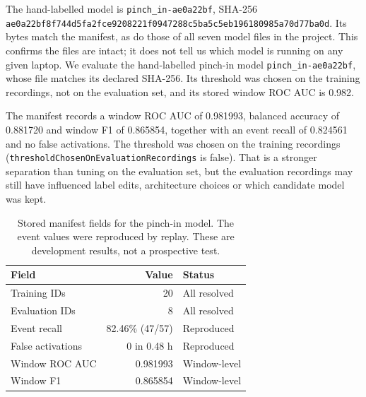 
\label{results}

\iffull
{}\label{later-hand-labelled-development-artifact}
\fi

\iffull
The hand-labelled model is \nolinkurl{pinch_in-ae0a22bf}, SHA-256 \nolinkurl{ae0a22bf8f744d5fa2fce9208221f0947288c5ba5c5eb196180985a70d77ba0d}. Its bytes match the manifest, as do those of all seven model files in the project. This confirms the files are intact; it does not tell us which model is running on any given laptop.
\else
We evaluate the hand-labelled pinch-in model \nolinkurl{pinch_in-ae0a22bf}, whose file matches its declared SHA-256. Its threshold was chosen on the training recordings, not on the evaluation set, and its stored window ROC AUC is 0.982.
\fi

\iffull
The manifest records a window ROC AUC of 0.981993, balanced accuracy of 0.881720 and window F1 of 0.865854, together with an event recall of 0.824561 and no false activations. The threshold was chosen on the training recordings (\nolinkurl{thresholdChosenOnEvaluationRecordings} is false). That is a stronger separation than tuning on the evaluation set, but the evaluation recordings may still have influenced label edits, architecture choices or which candidate model was kept.
\fi

\iffull
\begin{table}[t]
\centering\small
\caption[Stored manifest fields of the pinch-in model]{Stored manifest fields for the pinch-in model. The event values were reproduced by replay. These are development results, not a prospective test.}
\begin{tabularx}{\linewidth}{@{}>{\raggedright\arraybackslash}Xr>{\raggedright\arraybackslash}X@{}}
\toprule
\textbf{Field} & \textbf{Value} & \textbf{Status} \\
\midrule
Training IDs & 20 & All resolved \\
Evaluation IDs & 8 & All resolved \\
Event recall & 82.46\% (47/57) & Reproduced \\
False activations & 0 in 0.48 h & Reproduced \\
Window ROC AUC & 0.981993 & Window-level \\
Window F1 & 0.865854 & Window-level \\
\bottomrule
\end{tabularx}
\end{table}
\fi

